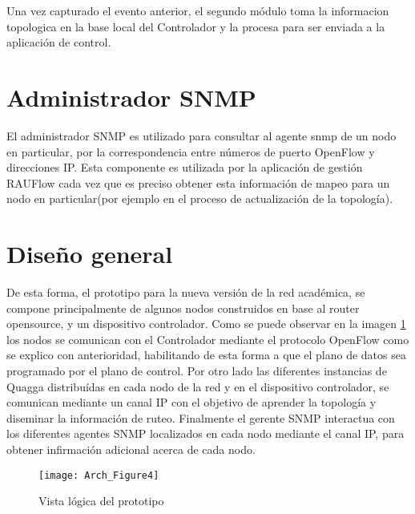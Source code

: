 Una vez capturado el evento anterior, el segundo m\'odulo toma la informacion topologica en la base local del Controlador y la procesa para ser enviada a la aplicación de control.

\section{Administrador SNMP}

El administrador SNMP es utilizado para consultar al agente snmp de un nodo en particular, por la correspondencia entre números de puerto OpenFlow y direcciones IP. Esta componente es utilizada por la aplicación de gestión RAUFlow cada vez que es preciso obtener esta información de mapeo para un nodo en particular(por ejemplo en el proceso de actualización de la topolog\'ia).

\section{Dise\~no general}

De esta forma, el prototipo para la nueva versi\'on de la red acad\'emica, se compone principalmente de algunos nodos construidos en base al router opensource, y un dispositivo controlador. Como se puede observar en la imagen \ref{fig:OpenSourceRArch4} los nodos se comunican con el Controlador mediante el protocolo OpenFlow como se explico con anterioridad, habilitando de esta forma a que el plano de datos sea programado por el plano de control. Por otro lado las diferentes instancias de Quagga distribu\'idas en cada nodo de la red y en el dispositivo controlador, se comunican mediante un canal IP con el objetivo de aprender la topolog\'ia y diseminar la informaci\'on de ruteo. Finalmente el gerente SNMP interactua con los diferentes agentes SNMP localizados en cada nodo mediante el canal IP, para obtener infirmaci\'on adicional acerca de cada nodo. 

\begin{figure}[htbp!] 
\centering    
\texttt{[image: Arch\_Figure4]}
\caption[OpenSourceRArch4]{Vista l\'ogica del prototipo}
\label{fig:OpenSourceRArch4}
\end{figure}